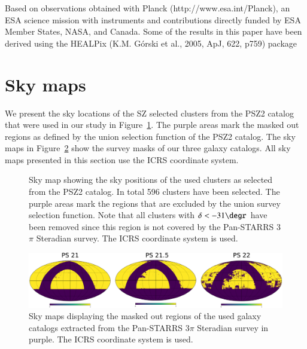 \documentclass[iop, apjl, twocolappendix, numberedappendix]{emulateapj}
\begin{document}
Based on observations obtained with Planck
(http://www.esa.int/Planck), an ESA science mission with instruments
and contributions directly funded by ESA Member States, NASA, and
Canada.  Some of the results in this paper have been derived using
the HEALPix (K.M. Górski et al., 2005, ApJ, 622, p759) package


 



\appendix

\section{Sky maps}
\label{sec:figures}
We present the sky locations of the SZ selected clusters from the PSZ2
catalog that were used in our study in Figure~\ref{fig:planck_fig}.
The purple areas mark the masked out regions as defined by the union
selection function of the PSZ2 catalog. The sky maps in
Figure~\ref{fig:heal_map} show the survey masks of our three galaxy
catalogs. All sky maps presented in this section use the ICRS
coordinate system.

\begin{figure}
\caption{Sky map showing the sky positions of the used clusters as
selected from the PSZ2 catalog. In total 596 clusters have been
selected. The purple areas mark the regions that are excluded by the
union survey selection function. Note that all clusters with
$\delta<-31\degr$ have been removed since this region is not covered
by the Pan-STARRS 3$\pi$ Steradian survey. The ICRS coordinate
system is used.}
    \label{fig:planck_fig} 
\end{figure}

\begin{figure}
    \includegraphics[width= \textwidth]{heal_maps.png}
\caption{Sky maps displaying the masked out regions of the used
galaxy catalogs extracted from the Pan-STARRS 3$\pi$ Steradian
survey in purple. The ICRS coordinate system is used.}
   \label{fig:heal_map} 
\end{figure}
\end{document}
